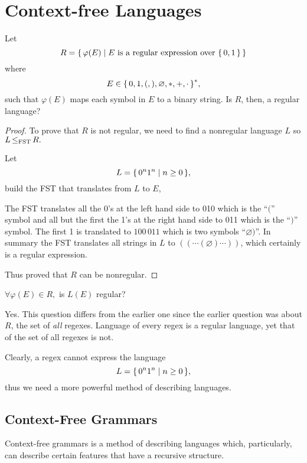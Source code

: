 
\section{Context-free Languages}
\label{sec:context-free_lang}

Let
\[
    R = { \left\{\, \varphi(E) \mid \text{$E$ is a regular expression over ${ \left\{\,0,1\,\right\} }$} \,\right\} }
\]
where
\[
    E \in { \left\{\,0,1,(,),\varnothing,*,+,\cdot\,\right\} }^*,
\]
such that
$\varphi(E)$ maps each symbol in $E$ to a binary string.
Is $R$, then, a regular language?

\begin{proof}
To prove that $R$ is not regular, we need to find a nonregular language $L$ so
$
L { \,\le_{\text{\upshape FST}}\, } R
.$

Let
\[
    L = { \left\{\, 0^n 1^n \mid n \ge 0\,\right\} }
,\]
build the FST that translates from $L$ to $E$,

The FST translates all the 0's at the left hand side to 010 which is the ``$($'' symbol and
all but the first the 1's at the right hand side to 011 which is the ``$)$'' symbol.
The first 1 is translated to $100\,011$ which is two symbols ``$\varnothing)$''.
In summary the FST translates all strings in $L$ to $((\cdots(\varnothing)\cdots))$,
which certainly is a regular expression.

Thus proved that $R$ can be nonregular.
\end{proof}

\begin{example}
$
\forall \varphi(E) \in R,
$
is $L(E)$ regular?

Yes. This question differs from the earlier one since the earlier question was about
$R$, the set of \emph{all} regexes. Language of every regex is a regular language, yet
that of the set of all regexes is not.
\end{example}

Clearly, a regex cannot express the language 
\[
    L = { \left\{\, 0^n 1^n \mid n \ge 0 \,\right\} }
,\]
thus we need a more powerful method of describing languages.

\subsection{Context-Free Grammars}

Context-free grammars is a method of describing languages which, particularly, can
describe certain features that have a recursive structure.

